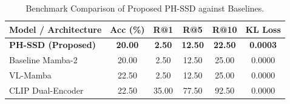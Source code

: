 \begin{table}[ht]
\centering
\caption{Benchmark Comparison of Proposed PH-SSD against Baselines.}
\label{tab:main_results}
\begin{tabular}{lccccc}
\toprule
Model / Architecture & Acc (\%) & R@1 & R@5 & R@10 & KL Loss \\
\midrule
\textbf{PH-SSD (Proposed)} & \textbf{20.00} & \textbf{2.50} & \textbf{12.50} & \textbf{22.50} & \textbf{0.0003} \\
Baseline Mamba-2 & 20.00 & 2.50 & 12.50 & 25.00 & 0.0000 \\
VL-Mamba & 22.50 & 2.50 & 12.50 & 25.00 & 0.0000 \\
CLIP Dual-Encoder & 22.50 & 35.00 & 77.50 & 92.50 & 0.0000 \\
\bottomrule
\end{tabular}
\end{table}
